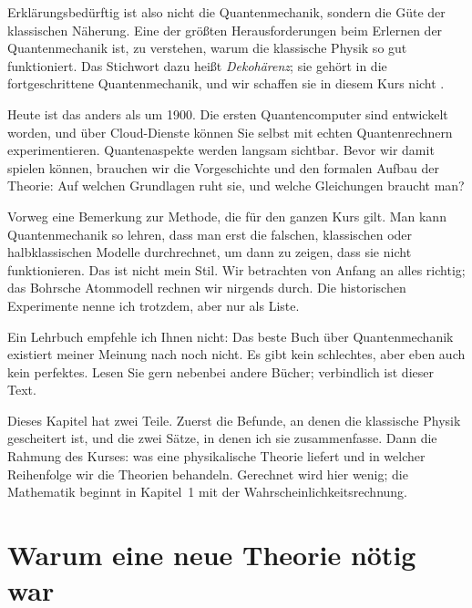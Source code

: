 Erklärungsbedürftig ist also nicht die Quantenmechanik, sondern die Güte der klassischen
Näherung. Eine der größten Herausforderungen beim Erlernen der Quantenmechanik ist, zu
verstehen, warum die klassische Physik so gut funktioniert. Das Stichwort dazu heißt
\emph{Dekohärenz}; sie gehört in die fortgeschrittene Quantenmechanik, und wir schaffen sie
in diesem Kurs nicht .

Heute ist das anders als um 1900. Die ersten Quantencomputer sind entwickelt worden, und über
Cloud-Dienste können Sie selbst mit echten Quantenrechnern experimentieren.
Quantenaspekte werden langsam sichtbar. Bevor wir damit spielen können, brauchen wir die
Vorgeschichte und den formalen Aufbau der Theorie: Auf welchen Grundlagen ruht sie, und
welche Gleichungen braucht man?

Vorweg eine Bemerkung zur Methode, die für den ganzen Kurs gilt. Man kann Quantenmechanik so
lehren, dass man erst die falschen, klassischen oder halbklassischen Modelle durchrechnet, um
dann zu zeigen, dass sie nicht funktionieren. Das ist nicht mein Stil. Wir betrachten von
Anfang an alles richtig; das Bohrsche Atommodell rechnen wir nirgends durch. Die
historischen Experimente nenne ich trotzdem, aber nur als Liste.

Ein Lehrbuch empfehle ich Ihnen nicht: Das beste Buch über Quantenmechanik existiert meiner
Meinung nach noch nicht. Es gibt kein schlechtes, aber eben auch kein perfektes. Lesen Sie
gern nebenbei andere Bücher; verbindlich ist dieser Text.

Dieses Kapitel hat zwei Teile. Zuerst die Befunde, an denen die klassische Physik gescheitert
ist, und die zwei Sätze, in denen ich sie zusammenfasse. Dann die Rahmung des Kurses: was
eine physikalische Theorie liefert und in welcher Reihenfolge wir die Theorien behandeln.
Gerechnet wird hier wenig; die Mathematik beginnt in Kapitel~1 mit der
Wahrscheinlichkeitsrechnung.

\section{Warum eine neue Theorie nötig war}\label{c00.s4}

